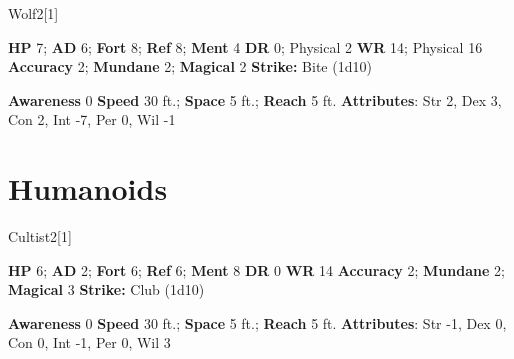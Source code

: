   
  \begin{monsection}{Wolf}{2}[1]
    \vspace{-1em}\vspace{-1em}
    \begin{spellcontent}
      \begin{spelltargetinginfo}
        \pari \textbf{HP} 7;
          \textbf{AD} 6;
          \textbf{Fort} 8;
          \textbf{Ref} 8;
          \textbf{Ment} 4
        \pari \textbf{DR} 0; Physical 2
        \pari \textbf{WR} 14; Physical 16
        \pari \textbf{Accuracy} 2;
          \textbf{Mundane} 2;
          \textbf{Magical} 2
        \pari \textbf{Strike:}
            Bite  (1d10)
      \end{spelltargetinginfo}
    \end{spellcontent}
    \begin{monsterfooter}
      \pari \textbf{Awareness} 0
      \pari \textbf{Speed} 30 ft.;
        \textbf{Space} 5 ft.;
        \textbf{Reach} 5 ft.
      \pari \textbf{Attributes}:
        Str 2, Dex 3, Con 2,
        Int -7, Per 0, Wil -1
    \end{monsterfooter}
  \end{monsection}
  
  
        \section{Humanoids}
      
  \begin{monsection}{Cultist}{2}[1]
    \vspace{-1em}\vspace{-1em}
    \begin{spellcontent}
      \begin{spelltargetinginfo}
        \pari \textbf{HP} 6;
          \textbf{AD} 2;
          \textbf{Fort} 6;
          \textbf{Ref} 6;
          \textbf{Ment} 8
        \pari \textbf{DR} 0
        \pari \textbf{WR} 14
        \pari \textbf{Accuracy} 2;
          \textbf{Mundane} 2;
          \textbf{Magical} 3
        \pari \textbf{Strike:}
            Club  (1d10)
      \end{spelltargetinginfo}
    \end{spellcontent}
    \begin{monsterfooter}
      \pari \textbf{Awareness} 0
      \pari \textbf{Speed} 30 ft.;
        \textbf{Space} 5 ft.;
        \textbf{Reach} 5 ft.
      \pari \textbf{Attributes}:
        Str -1, Dex 0, Con 0,
        Int -1, Per 0, Wil 3
    \end{monsterfooter}
  \end{monsection}
